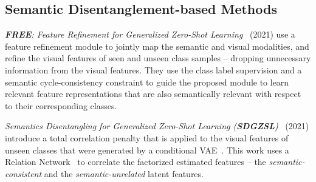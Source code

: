 \subsection{Semantic Disentanglement-based Methods}

\textit{\textbf{FREE}: Feature Refinement for Generalized Zero-Shot Learning}~\cite{Chen2021FREE} (2021) use a feature refinement module to jointly map the semantic and visual modalities, and refine the visual features of seen and unseen class samples -- dropping unnecessary information from the visual features. They use the class label supervision and a semantic cycle-consistency
constraint to guide the proposed module to learn relevant feature representations that are also semantically relevant with respect to their corresponding classes.


\textit{Semantics Disentangling for Generalized Zero-Shot Learning (\textbf{SDGZSL})}~\cite{SDGZSL} (2021) introduce a total correlation penalty that is applied to the visual features of unseen classes that were generated by a conditional VAE~\cite{VAEs}. This work uses a Relation Network~\cite{RelNetwork} to correlate the factorized estimated features -- the \textit{semantic-consistent} and the \textit{semantic-unrelated} latent features.


